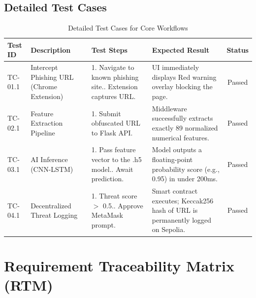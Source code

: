 \subsection{Detailed Test Cases}

\begin{table}[htbp]
    \centering
    \renewcommand{\arraystretch}{1.5} 
    \begin{tabular}{|p{}|p{}|p{}|p{}|c|}
        \hline
        \textbf{Test ID} & \textbf{Description} & \textbf{Test Steps} & \textbf{Expected Result} & \textbf{Status} \\ 
        \hline
        TC-01.1 & Intercept Phishing URL (Chrome Extension) & 1. Navigate to known phishing site.\newline 2. Extension captures URL. & UI immediately displays Red warning overlay blocking the page. & Passed \\ 
        \hline
        TC-02.1 & Feature Extraction Pipeline & 1. Submit obfuscated URL to Flask API. & Middleware successfully extracts exactly 89 normalized numerical features. & Passed \\ 
        \hline
        TC-03.1 & AI Inference (CNN-LSTM) & 1. Pass feature vector to the .h5 model.\newline 2. Await prediction. & Model outputs a floating-point probability score (e.g., 0.95) in under 200ms. & Passed \\ 
        \hline
        TC-04.1 & Decentralized Threat Logging & 1. Threat score $>$ 0.5.\newline 2. Approve MetaMask prompt. & Smart contract executes; Keccak256 hash of URL is permanently logged on Sepolia. & Passed \\ 
        \hline
    \end{tabular}
    \vspace{0.2cm}
    \caption{Detailed Test Cases for Core Workflows}
\end{table}

\section{Requirement Traceability Matrix (RTM)}

